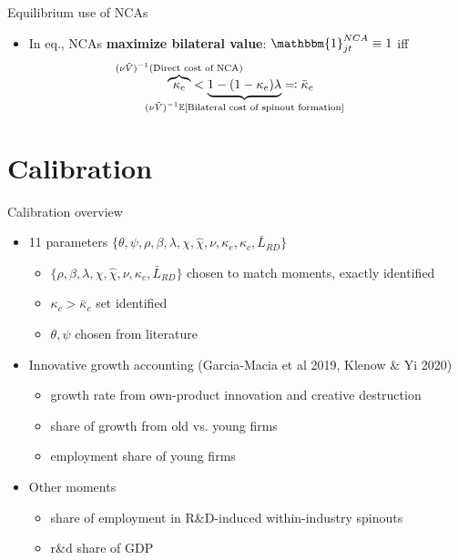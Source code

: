 \documentclass[english,usenames,dvipsnames]{beamer}
\begin{document}
\begin{frame}{Equilibrium use of NCAs}\label{use_of_ncas}
	\begin{itemize}
		\item In eq., NCAs \alert{\textbf{maximize bilateral value}}: $\mathbbm{1}^{NCA}_{jt} \equiv 1$ iff
		\begin{align*}
		\overbrace{\kappa_c}^{\mathclap{(\nu \tilde{V})^{-1} (\text{Direct cost of NCA})}} &< \underbrace{1 - (1-\kappa_e) \lambda}_{\mathclap{(\nu\tilde{V})^{-1}\mathbb{E}[\text{Bilateral cost of spinout formation}]}} \eqqcolon \bar{\kappa}_c
		\end{align*}
		\hyperlink{use_of_ncas_details}{}
	\end{itemize}
\end{frame}

\section{Calibration}


\begin{frame}
\tableofcontents[currentsection]
\end{frame}

\begin{frame}{Calibration overview}\label{calibration_overview}
	\begin{itemize}
		\item 11 parameters $\{\theta, \psi, \rho, \beta, \lambda , \chi, \hat{\chi}, \nu, \kappa_e, \kappa_c, \bar{L}_{RD} \}$
		\smallskip
		\begin{itemize}
			\item $\{\rho, \beta, \lambda ,\chi, \hat{\chi}, \nu, \kappa_e, \bar{L}_{RD} \}$ chosen to match moments, exactly identified \hyperlink{calibration_targets}{} \hyperlink{parameters}{} 
			\item $\kappa_c > \bar{\kappa}_{c}$ set identified
			\item $\theta, \psi$ chosen from literature
		\end{itemize}
		\medskip
		\item Innovative growth accounting (Garcia-Macia et al 2019, Klenow \& Yi 2020)
		\begin{itemize}
			\item growth rate from own-product innovation and creative destruction
			\item share of growth from old vs. young firms
			\item employment share of young firms 
		\end{itemize}
		\medskip
		\item Other moments 
		\begin{itemize}
			\item share of employment in R\&D-induced within-industry spinouts	\hyperlink{economic_magnitude}{} 
			\item r\&d share of GDP
		\end{itemize}
	\end{itemize}
\end{frame}
\end{document}

